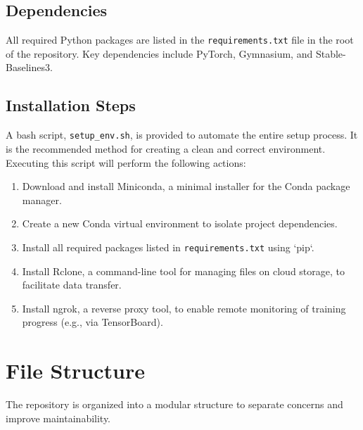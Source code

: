 \subsection{Dependencies}
All required Python packages are listed in the \texttt{requirements.txt} file in the root of the repository. Key dependencies include PyTorch, Gymnasium, and Stable-Baselines3.

\subsection{Installation Steps}
A bash script, \texttt{setup\_env.sh}, is provided to automate the entire setup process. It is the recommended method for creating a clean and correct environment. Executing this script will perform the following actions:
\begin{enumerate}
    \item Download and install Miniconda, a minimal installer for the Conda package manager.
    \item Create a new Conda virtual environment to isolate project dependencies.
    \item Install all required packages listed in \texttt{requirements.txt} using `pip`.
    \item Install Rclone, a command-line tool for managing files on cloud storage, to facilitate data transfer.
    \item Install ngrok, a reverse proxy tool, to enable remote monitoring of training progress (e.g., via TensorBoard).
\end{enumerate}

\section{File Structure}
The repository is organized into a modular structure to separate concerns and improve maintainability.

